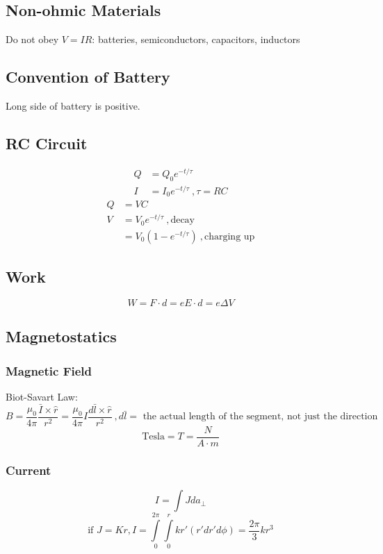 \documentclass[10pt,letter]{article}
\begin{document}
\subsection{Non-ohmic Materials}
Do not obey $V=IR$: batteries, semiconductors, capacitors, inductors

\subsection{Convention of Battery}
Long side of battery is positive.

\subsection{RC Circuit}
\begin{align}
 Q &= Q_0 e^{-t/\tau}\\
 I &= I_0 e^{-t/\tau}~,\tau = RC
\end{align}
\begin{align}
 Q &= VC\\
V &= V_0 e^{-t/\tau}~,\textrm{decay}\\
&= V_0(1-e^{-t/\tau})~, \textrm{charging up}
\end{align}

\subsection{Work}
\begin{equation}
 W = F\cdot d = eE\cdot d = e \Delta V
\end{equation}

\subsection{Magnetostatics}

\subsubsection{Magnetic Field}
Biot-Savart Law:
\begin{equation}
 B = \frac{\mu_0}{4\pi}\frac{\bar{I} \times \hat{r}}{r^2} = \frac{\mu_0}{4 \pi}I \frac{d\bar{l} \times \hat{r}}{r^2}~,d\bar{l} =\textrm{ the actual length of the segment, not just the direction}
\end{equation}
\begin{equation}
 \textrm{Tesla} = T = \frac{N}{A \cdot m}
\end{equation}

\subsubsection{Current}
\begin{equation}
 I = \int J da_\perp 
\end{equation}
\begin{equation}
\textrm{if }J = Kr, I = \int \limits_0^{2\pi} \int \limits_0^r kr' (r' dr' d\phi) = \frac{2\pi}{3}kr^3
\end{equation}
\end{document}
